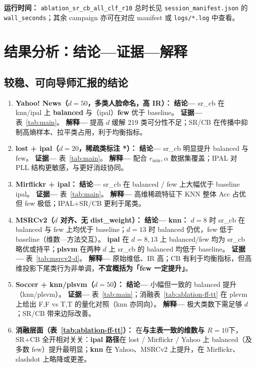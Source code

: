 \documentclass[11pt,a4paper]{article}
\begin{document}
\noindent\textbf{运行时间：} \texttt{ablation\_sr\_cb\_all\_clf\_r10} 总时长见 \texttt{session\_manifest.json} 的 \texttt{wall\_seconds}；其余 campaign 亦可在对应 manifest 或 \texttt{logs/*.log} 中查看。

\section{结果分析：结论—证据—解释}

\subsection{较稳、可向导师汇报的结论}
\begin{enumerate}
  \item \textbf{Yahoo! News（$d{=}50$，多类人脸命名，高 IR）：}
  \textbf{结论—} sr\_cb 在 knn/ipal 上 \textbf{balanced} 与（ipal）\textbf{few} 优于 baseline。
  \textbf{证据—} 表~\ref{tab:main}。
  \textbf{解释—} 提高 $d$ 缓解 219 类可分性不足；SR/CB 在传播中抑制高熵样本、拉平类占用，利于均衡指标。

  \item \textbf{lost + ipal（$d{=}20$，稀疏类标注 *）：}
  \textbf{结论—} sr\_cb 明显提升 balanced 与 few。
  \textbf{证据—} 表~\ref{tab:main}。
  \textbf{解释—} 配合 $r_{\min},\alpha$ 数据集覆盖；IPAL 对 PLL 结构更敏感，与更好消歧协同。

  \item \textbf{Mirflickr + ipal：}
  \textbf{结论—} sr\_cb 在 balanced / few 上大幅优于 baseline ipal。
  \textbf{证据—} 表~\ref{tab:main}。
  \textbf{解释—} 高维稀疏特征下 KNN 整体 Acc 占优但 few 极低；IPAL+SR/CB 更利于尾类。

  \item \textbf{MSRCv2（$d$ 对齐、无 dist\_weight）：}
  \textbf{结论—} \textbf{knn：} $d{=}8$ 时 sr\_cb 在 balanced 与 few 上均优于 baseline；$d{=}13$ 时 balanced 仍优，few 低于 baseline（维数—方法交互）。
  \textbf{ipal} 在 $d{=}8,13$ 上 balanced/few 均为 sr\_cb 略优或持平；\textbf{plsvm} 在两种 $d$ 上 sr\_cb 的 balanced 均低于 baseline。
  \textbf{证据—} 表~\ref{tab:msrcv2-d}。
  \textbf{解释—} 原始维低、IR 高；CB 有利于均衡指标，但高维投影下尾类行为非单调，\textbf{不宜概括为「few 一定提升」}。

  \item \textbf{Soccer + knn/plsvm（$d{=}50$）：}
  \textbf{结论—} 小幅但一致的 balanced 提升（knn/plsvm）。
  \textbf{证据—} 表~\ref{tab:main}；消融表~\ref{tab:ablation-ff-tt} 在 plsvm 上给出 F,F vs T,T 的量化对照（knn 亦同向）。
  \textbf{解释—} 极大类数下需足够 $d$；SR/CB 带来边际改善。

  \item \textbf{消融层面（表~\ref{tab:ablation-ff-tt}）：}
  在\textbf{与主表一致的维数与 $R{=}10$}下，SR+CB 全开相对关关：\textbf{ipal 路径}在 lost / Mirflickr / Yahoo 上 balanced（及多数 few）提升最明显；\textbf{knn} 在 Yahoo、MSRCv2 上提升，在 Mirflickr、slashdot 上略降或更差。
\end{enumerate}
\end{document}
